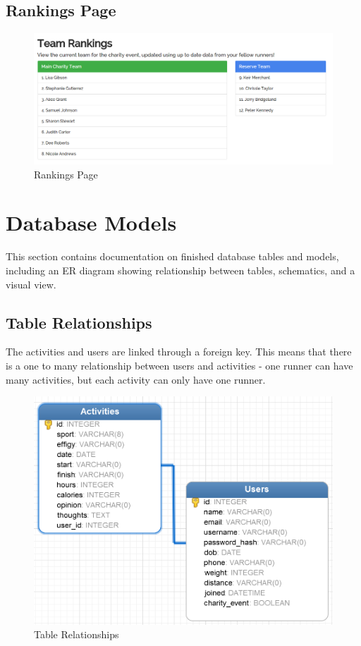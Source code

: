 \documentclass{article}[12pt,a4paper]
\begin{document}
\clearpage

\subsection{Rankings Page}

\begin{figure}[h!]
  \includegraphics[scale=0.35]{final_ui/rankings}
  \caption{Rankings Page}
\end{figure}

\section{Database Models}
This section contains documentation on finished database tables and models, including an ER diagram showing relationship between tables, schematics, and a visual view.

\subsection{Table Relationships}
The activities and users are linked through a foreign key. This means that there is a one to many relationship between users and activities - one runner can have many activities, but each activity can only have one runner.

\begin{figure}[h!]
  \includegraphics[scale=0.2]{images/database/er_diagram}
  \caption{Table Relationships}
\end{figure}
\end{document}
